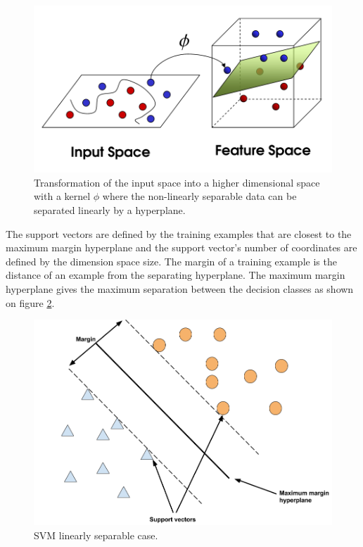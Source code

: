 \documentclass[11pt,a4paper,oneside]{book}
\begin{document}
\begin{figure}[!h]
  \centering
    \includegraphics[scale=0.45]{img/svm.png}
  \caption{Transformation of the input space into a higher dimensional space with a kernel $\phi$ where the non-linearly separable data can be separated linearly by a hyperplane. \cite{svmpic}}
  \label{fig:svm}
\end{figure}


The support vectors are defined by the training examples that are closest to the maximum margin hyperplane and the support vector's number of coordinates are defined by the dimension space size. The margin of a training example is the distance of an example from the separating hyperplane. The maximum margin hyperplane gives the maximum separation between the decision classes as shown on figure \ref{fig:svm_linear_sep}. 

\begin{figure}[!h]
  \centering
    \includegraphics[scale=0.3]{img/svm1.png}
  \caption{SVM linearly separable case.}
  \label{fig:svm_linear_sep}
\end{figure}
\end{document}
